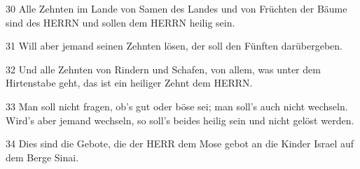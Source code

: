 \par 30 Alle Zehnten im Lande von Samen des Landes und von Früchten der Bäume sind des HERRN und sollen dem HERRN heilig sein.
\par 31 Will aber jemand seinen Zehnten lösen, der soll den Fünften darübergeben.
\par 32 Und alle Zehnten von Rindern und Schafen, von allem, was unter dem Hirtenstabe geht, das ist ein heiliger Zehnt dem HERRN.
\par 33 Man soll nicht fragen, ob's gut oder böse sei; man soll's auch nicht wechseln. Wird's aber jemand wechseln, so soll's beides heilig sein und nicht gelöst werden.
\par 34 Dies sind die Gebote, die der HERR dem Mose gebot an die Kinder Israel auf dem Berge Sinai.



